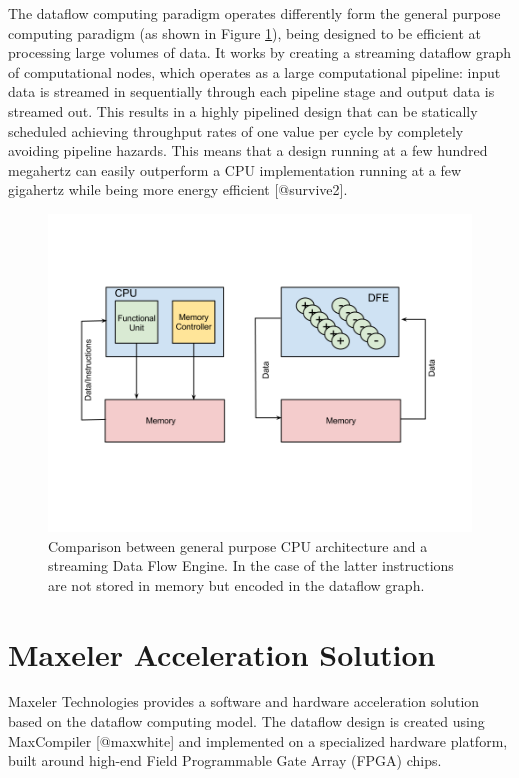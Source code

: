 The dataflow computing paradigm operates differently form the general
purpose computing paradigm (as shown in Figure \ref{fig:cpudfe}),
being designed to be efficient at processing large volumes of data. It
works by creating a streaming dataflow graph of computational nodes,
which operates as a large computational pipeline: input data is
streamed in sequentially through each pipeline stage and output data
is streamed out. This results in a highly pipelined design that can be
statically scheduled achieving throughput rates of one value per cycle
by completely avoiding pipeline hazards. This means that a design
running at a few hundred megahertz can easily outperform a CPU
implementation running at a few gigahertz while being more energy
efficient [@survive2].


\begin{figure}[h] \centering
\includegraphics[scale=0.4, trim=0 200 0 150]{figs/cpu-vs-dfe.png}
\caption{Comparison between general purpose CPU architecture and a
streaming Data Flow Engine. In the case of the latter instructions are
not stored in memory but encoded in the dataflow graph. }
\label{fig:cpudfe}
\end{figure}

\section{Maxeler Acceleration Solution}

Maxeler Technologies provides a software and hardware acceleration
solution based on the dataflow computing model. The dataflow design is
created using MaxCompiler [@maxwhite] and implemented on a specialized
hardware platform, built around high-end Field Programmable Gate Array
(FPGA) chips.




